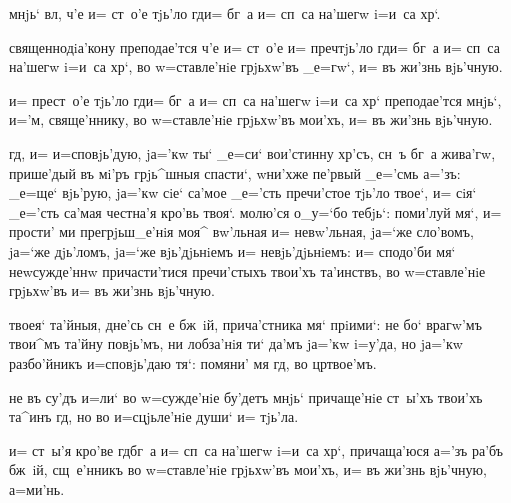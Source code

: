  мнjь` вл, 
ч'е и= ст~о'е тjь'ло гд и= бг~а и= сп~са на'шегw 
i=и~са хр`.


 священнодiа'кону преподае'тся ч'е и= 
ст~о'е и= преч тjь'ло гд и= бг~а и= сп~са на'шегw 
i=и~са хр`, во w=ставле'нiе грjьхw'въ _е=гw`, и= въ 
жи'знь вjь'чную.



 и= прест~о'е тjь'ло гд и= бг~а и= сп~са 
на'шегw i=и~са хр` преподае'тся мнjь`, и='м, 
свяще'ннику, во w=ставле'нiе грjьхw'въ мои'хъ, и= въ 
жи'знь вjь'чную.


 гд, и= и=сповjь'дую, jа='кw ты` _е=си` 
вои'стинну хр'съ, сн~ъ бг~а жива'гw, прише'дый въ 
мi'ръ грjь^шныя спасти`, w\т ни'хже пе'рвый _е='смь 
а='зъ: _е=ще` вjь'рую, jа='кw сiе` са'мое _е='сть 
пречи'стое тjь'ло твое`, и= сiя` _е='сть са'мая честна'я 
кро'вь твоя`. молю'ся о_у=`бо тебjь`: поми'луй мя`, и= 
прости' ми прегрjьш_е'нiя моя^ вw'льная и= невw'льная, 
jа=`же сло'вомъ, jа=`же дjь'ломъ, jа=`же вjь'дjьнiемъ и= 
невjь'дjьнiемъ: и= сподо'би мя` неwсужде'ннw 
причасти'тися пречи'стыхъ твои'хъ та'инствъ, во 
w=ставле'нiе грjьхw'въ и= въ жи'знь вjь'чную.

  твоея` та'йныя, дне'сь сн~е бж~iй, 
прича'стника мя` прiими`: не бо` врагw'мъ твои^мъ та'йну 
повjь'мъ, ни лобза'нiя ти` да'мъ jа='кw i=у'да, но jа='кw 
разбо'йникъ и=сповjь'даю тя`: помяни' мя гд, во 
цр твое'мъ.

 не въ су'дъ и=ли` во w=сужде'нiе бу'детъ мнjь` 
причаще'нiе ст~ы'хъ твои'хъ та^инъ гд, но во 
и=сцjьле'нiе души` и= тjь'ла.



 и= ст~ы'я кро'ве гд бг~а и= сп~са на'шегw 
i=и~са хр`, причаща'юся а='зъ ра'бъ бж~iй, сщ~е'нникъ 
 во w=ставле'нiе грjьхw'въ мои'хъ, и= въ жи'знь 
вjь'чную, а=ми'нь.

